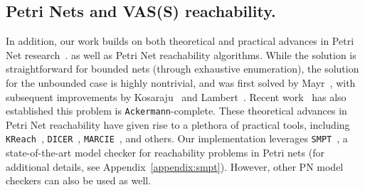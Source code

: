 \subsection{Petri Nets and VAS(S) reachability.}
\label{sec:related:petri}

In addition, our work builds on both theoretical and practical advances in 
Petri Net research~\cite{Mu89, Es96, Re12, EsNi24}. 
%
as well as Petri Net reachability algorithms. While the solution is 
straightforward for bounded nets (through exhaustive enumeration), the solution 
for the unbounded case is highly nontrivial, and was first solved by 
Mayr~\cite{Ma81}, with subsequent improvements by Kosaraju~\cite{Ko82} and 
Lambert~\cite{La92}. Recent work~\cite{CzWo22} has also established this 
problem is \texttt{Ackermann}-complete.
%
These theoretical advances in Petri Net reachability have given rise to a 
plethora of practical tools, including \texttt{KReach}~\cite{DiLa20}, 
\texttt{DICER}~\cite{XiZhLi21}, \texttt{MARCIE}~\cite{HeRoSc13}, and others. 
%
Our implementation leverages \texttt{SMPT}~\cite{AmDa23}, a state-of-the-art model checker for reachability problems in Petri nets (for additional details, see Appendix~\ref{appendix:smpt}). However,
 other PN model checkers can also be used as well.





